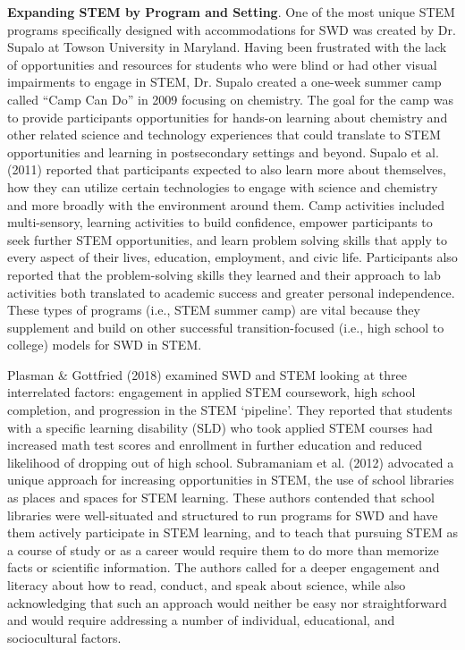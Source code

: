 \documentclass[11.5pt]{sig-alternate}
\begin{document}
\begin{large}
\textbf{Expanding STEM by Program and Setting}. One of the most unique STEM programs specifically designed with accommodations for SWD was created by Dr. Supalo at Towson University in Maryland. Having been frustrated with the lack of opportunities and resources for students who were blind or had other visual impairments to engage in STEM, Dr. Supalo created a one-week summer camp called “Camp Can Do” in 2009 focusing on chemistry. The goal for the camp was to provide participants opportunities for hands-on learning about chemistry and other related science and technology experiences that could translate to STEM opportunities and learning in postsecondary settings and beyond. Supalo et al. (2011) reported that participants expected to also learn more about themselves, how they can utilize certain technologies to engage with science and chemistry and more broadly with the environment around them. Camp activities included multi-sensory, learning activities to build confidence, empower participants to seek further STEM opportunities, and learn problem solving skills that apply to every aspect of their lives, education, employment, and civic life. Participants also reported that the problem-solving skills they learned and their approach to lab activities both translated to academic success and greater personal independence. These types of programs (i.e., STEM summer camp) are vital because they supplement and build on other successful transition-focused (i.e., high school to college) models for SWD in STEM. 

Plasman \& Gottfried (2018) examined SWD and STEM looking at three interrelated factors: engagement in applied STEM coursework, high school completion, and progression in the STEM ‘pipeline’. They reported that students with a specific learning disability (SLD) who took applied STEM courses had increased math test scores and enrollment in further education and reduced likelihood of dropping out of high school. Subramaniam et al. (2012) advocated a unique approach for increasing opportunities in STEM, the use of school libraries as places and spaces for STEM learning. These authors contended that school libraries were well-situated and structured to run programs for SWD and have them actively participate in STEM learning, and to teach that pursuing STEM as a course of study or as a career would require them to do more than memorize facts or scientific information. The authors called for a deeper engagement and literacy about how to read, conduct, and speak about science, while also acknowledging that such an approach would neither be easy nor straightforward and would require addressing a number of individual, educational, and sociocultural factors.     


\end{large}
\end{document}
